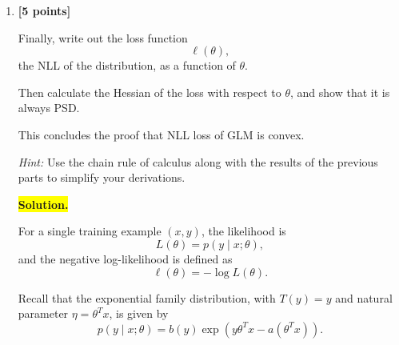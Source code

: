 \documentclass[10pt]{article}
\begin{document}
\begin{enumerate}
\begin{enumerate}[label=(\alph*)]
Substituting this expression into the integral yields
\[
\begin{aligned}
a''(\eta)
&=
\int_{\mathcal Y}
\left(
y^2p(y;\eta)-a'(\eta)y\,p(y;\eta)
\right)\,dy\\[4pt]
&=
\int_{\mathcal Y}y^2p(y;\eta)\,dy
-a'(\eta)\int_{\mathcal Y}y\,p(y;\eta)\,dy\\[4pt]
&=
\mathbb{E}[Y^2\mid X=x;\theta]
-a'(\eta)\mathbb{E}[Y\mid X=x;\theta]\\[4pt]
&=
\mathbb{E}[Y^2\mid X=x;\theta]
-\left(\mathbb{E}[Y\mid X=x;\theta]\right)^2\\[4pt]
&=
\operatorname{Var}(Y\mid X=x;\theta).
\end{aligned}
\]

Therefore,
\[
\boxed{
\operatorname{Var}(Y\mid X=x;\theta)
=
\frac{\partial}{\partial\eta}
\mathbb{E}[Y\mid X=x;\theta]
=
\frac{\partial^2a(\eta)}{\partial\eta^2}
=
a''(\theta^Tx).
}
\]

Hence, the conditional variance is equal to the second derivative
of the log-partition function with respect to the natural parameter.
\hfill $\square$


\item \textbf{[5 points]}

Finally, write out the loss function
\[
\ell(\theta),
\]
the NLL of the distribution, as a function of $\theta$.

Then calculate the Hessian of the loss with respect to $\theta$, and
show that it is always PSD.

This concludes the proof that NLL loss of GLM is convex.

\textit{Hint:}
Use the chain rule of calculus along with the results of the previous
parts to simplify your derivations.


\medskip
\noindent\colorbox{yellow}{\textbf{Solution.}}
\vspace{3mm}


For a single training example $(x,y)$, the likelihood is
\[
L(\theta)=p(y\mid x;\theta),
\]
and the negative log-likelihood is defined as
\[
\ell(\theta)=-\log L(\theta).
\]

Recall that the exponential family distribution, with
$T(y)=y$ and natural parameter $\eta=\theta^Tx$, is given by
\[
p(y\mid x;\theta)
=
b(y)\exp\left(y\theta^Tx-a(\theta^Tx)\right).
\]


\end{enumerate}
\end{enumerate}
\end{document}
